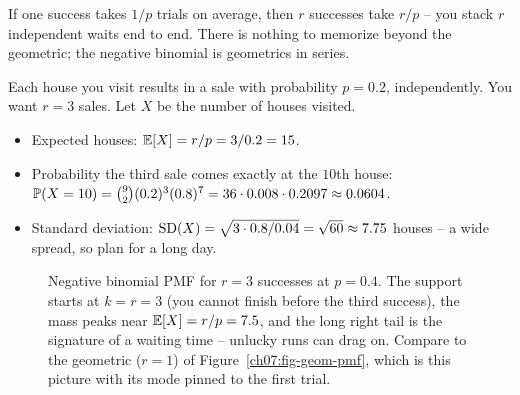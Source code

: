 \begin{intuitionbox}
If one success takes $1/p$ trials on average, then $r$ successes take $r/p$ -- you
stack $r$ independent waits end to end. There is nothing to memorize beyond
the geometric; the negative binomial is geometrics in series.
\end{intuitionbox}

\begin{example}
\label{ch07:ex-sales}
Each house you visit results in a sale with probability $p = 0.2$, independently.
You want $r = 3$ sales. Let $X$ be the number of houses visited.
\begin{itemize}
\item Expected houses: $\E[X] = r/p = 3/0.2 = 15$.
\item Probability the third sale comes exactly at the $10$th house:
  $\P(X = 10) = \binom{9}{2}(0.2)^3 (0.8)^7
  = 36 \cdot 0.008 \cdot 0.2097 \approx 0.0604$.
\item Standard deviation: $\SD(X) = \sqrt{3 \cdot 0.8 / 0.04}
  = \sqrt{60} \approx 7.75$ houses -- a wide spread, so plan for a long day.
\end{itemize}
\end{example}

\begin{figure}[H]
\centering
{}
\caption{Negative binomial PMF for $r=3$ successes at $p=0.4$. The support starts
at $k=r=3$ (you cannot finish before the third success), the mass peaks near
$\E[X]=r/p=7.5$, and the long right tail is the signature of a waiting time --
unlucky runs can drag on. Compare to the geometric ($r=1$) of
Figure~\ref{ch07:fig-geom-pmf}, which is this picture with its mode pinned to the
first trial.}
\label{ch07:fig-negbinom-pmf}
\end{figure}

